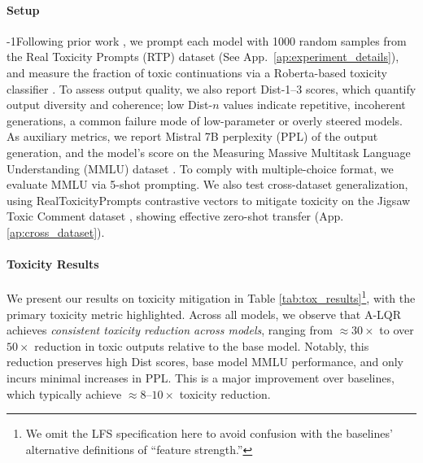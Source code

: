 \documentclass{article}
\theoremstyle{plain}
\theoremstyle{definition}
\theoremstyle{remark}
\begin{document}
\vspace{-10pt}
\paragraph{Setup} 
\looseness-1Following prior work \cite{Rodriguez_Blaas_Klein_Zappella_Apostoloff_Cuturi_Suau_2024,Nguyen_Vu_Pham_Zhang_Nguyen_2025}, we prompt each model with 1000 random samples from the Real Toxicity Prompts (RTP) dataset \cite{gehman2020realtoxicityprompts} (See App.~\ref{ap:experiment_details}), and measure the fraction of toxic continuations via a Roberta-based toxicity classifier \cite{s-nlp-2026-roberta_toxicity_classifier}. To assess output quality, we also report Dist-1–3 scores, which quantify output diversity and coherence; low Dist-$n$ values indicate repetitive, incoherent generations, a common failure mode of low-parameter or overly steered models. 
As auxiliary metrics, we report Mistral 7B \cite{Jiang_Sablayrolles_Mensch_Bamford_Chaplot_Casas_Bressand_Lengyel_Lample_Saulnier_et_al._2023} perplexity (PPL) of the output generation, and the model's score on the Measuring Massive Multitask Language Understanding (MMLU) dataset \cite{hendryckstest2021}. To comply with multiple-choice format, we evaluate MMLU via 5-shot prompting. We also test cross-dataset generalization, using RealToxicityPrompts contrastive vectors to mitigate toxicity on the Jigsaw Toxic Comment dataset \cite{jigsaw-toxic-comment-classification-challenge}, showing effective zero-shot transfer (App. \ref{ap:cross_dataset}).

\vspace{-12pt}
\paragraph{Toxicity Results}
We present our results on toxicity mitigation in Table \ref{tab:tox_results}\footnote{We omit the LFS specification here to avoid confusion with the baselines' alternative definitions of ``feature strength.''}, with the primary toxicity metric highlighted. Across all models, we observe that A-LQR achieves \textit{consistent toxicity reduction across models}, ranging from $\approx 30\times$ to over $50 \times$ reduction in toxic outputs relative to the base model. Notably, this reduction preserves high Dist scores, base model MMLU performance, and only incurs minimal increases in PPL. This is a major improvement over baselines, which typically achieve $\approx 8\text{--}10\times$ toxicity reduction.

\vspace{-12pt}
\end{document}
